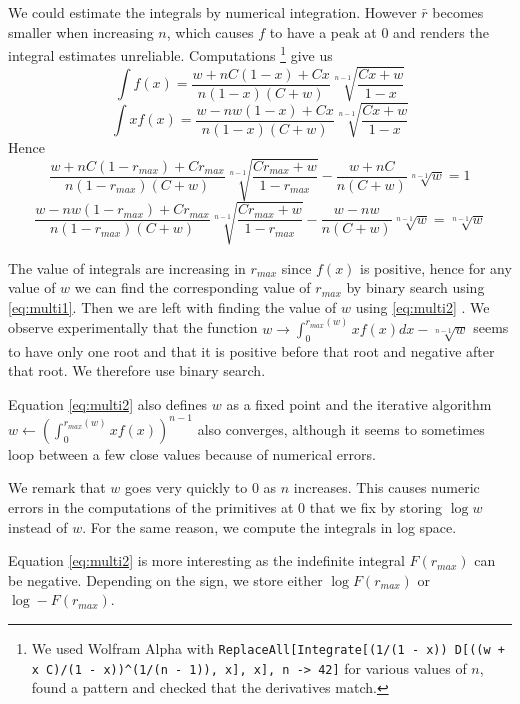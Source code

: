 \documentclass[preprint,12pt,authoryear,doubleblind]{elsarticle}
\theoremstyle{definition}
\begin{document}
We could estimate the integrals by numerical integration. However $\bar r$ becomes smaller when increasing $n$, which causes $f$ to have a peak at $0$ and renders the integral estimates unreliable.
Computations \footnote{We used Wolfram Alpha with \texttt{ReplaceAll[Integrate[(1/(1 - x)) D[((w + x C)/(1 - x))\^{}(1/(n - 1)), x], x], {n -> 42}]} for various values of $n$, found a pattern and checked that the derivatives match.} give us 
$$\int f(x) = \frac{w + nC(1-x) + Cx}{n (1 - x)(C+w)} \sqrt[n-1]{\frac{Cx + w}{1-x}}$$
$$\int x f(x) = \frac{w - n w  (1-x) + Cx}{n (1-x)(C+w)}\sqrt[n-1]{\frac{Cx+w}{1-x}}$$
Hence
\begin{equation}
\label{eq:multi1}
\frac{w + nC(1-{r_{max}}) + C{r_{max}}}{n (1 - {r_{max}})(C+w)} \sqrt[n-1]{\frac{C{r_{max}} + w}{1-{r_{max}}}} -  \frac{w + nC}{n (C+w)} \sqrt[n-1]{w} = 1
\end{equation}
\begin{equation}
\label{eq:multi2}
\frac{w - n w  (1-{r_{max}}) + C{r_{max}}}{n (1-{r_{max}})(C+w)}\sqrt[n-1]{\frac{C{r_{max}}+w}{1-{r_{max}}}} - \frac{w - n w}{n (C+w)}\sqrt[n-1]{w} = \sqrt[n-1]{w}
\end{equation}

The value of integrals are increasing in ${r_{max}}$ since $f(x)$ is positive, hence for any value of $w$ we can find the corresponding value of ${r_{max}}$ by binary search using \eqref{eq:multi1}. Then we are left with finding the value of $w$ using \eqref{eq:multi2} . We observe experimentally that the function $w \rightarrow \int_0^{{r_{max}}(w)}xf(x)dx - \sqrt[n-1]{w}$ seems to have only one root and that it is positive before that root and negative after that root. We therefore use binary search.

Equation \eqref{eq:multi2} also defines $w$ as a fixed point and the iterative algorithm $w \leftarrow \left(\int_0^{{r_{max}}(w)}x f(x)\right)^{n-1}$ also converges, although it seems to sometimes loop between a few close values because of numerical errors.

We remark that $w$ goes very quickly to $0$ as $n$ increases. This causes numeric errors in the computations of the primitives at $0$ that we fix by storing $\log w$ instead of $w$.  For the same reason, we compute the integrals in log space.

Equation \eqref{eq:multi2} is more interesting as the indefinite integral $F({r_{max}})$ can be negative. Depending on the sign, we store either $\log F({r_{max}})$ or $\log -F({r_{max}})$.
\end{document}

